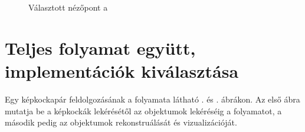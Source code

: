\begin{figure}[tbh]
\begin{subfigure}[b]{.49\linewidth}
	\caption{}
  \end{subfigure}
\caption{Választott nézőpont a \label{fig:visu_slider}}
\end{figure}

\section{Teljes folyamat együtt, implementációk kiválasztása}

Egy képkockapár feldolgozásának a folyamata látható . és . ábrákon. Az első ábra mutatja be a képkockák lekérésétől az objektumok lekéréséig a folyamatot, a második pedig az objektumok rekonstruálását és vizualizációját.

